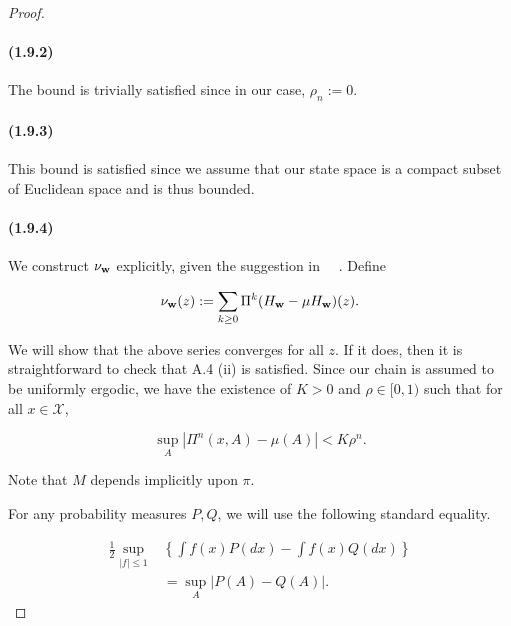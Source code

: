 \begin{appendices}
\begin{proof}
\paragraph{(1.9.2)}
The bound is trivially satisfied since in our case, $\rho_n := 0$.

\paragraph{(1.9.3)}
This bound is satisfied since we assume that our state space is a compact subset of Euclidean space and is thus bounded.

\paragraph{(1.9.4)}
We construct $\nu_{\mathbf{w}}$ explicitly, given the suggestion in ~\citeauthor[p.217]{benveniste1990stochastic}~. Define

\begin{equation*}
    \nu_{\mathbf{w}}(z) := \sum_{k \geq 0} \Pi^k(H_{\mathbf{w}} - \mu H_{\mathbf{w}})(z).
\end{equation*}

\noindent We will show that the above series converges for all $z$. If it does, then it is straightforward to check that A.4 (ii) is satisfied. Since our chain is assumed to be uniformly ergodic, we have the existence of $K > 0$ and $\rho \in [0, 1)$ such that for all $x \in \mathcal{X}$,

\begin{equation*}
    \sup_A |\Pi^n(x, A) - \mu(A)| < K \rho^n.
\end{equation*}

\noindent Note that $M$ depends implicitly upon $\pi$.

For any probability measures $P, Q$, we will use the following standard equality.

\begin{align*}
    \frac{1}{2} \sup_{|f| \leq 1} & \left\{\int f(x) P(dx) - \int f(x) Q(dx)\right\} \\
    &= \sup_A |P(A) - Q(A)|.
\end{align*}


\end{proof}
\end{appendices}
